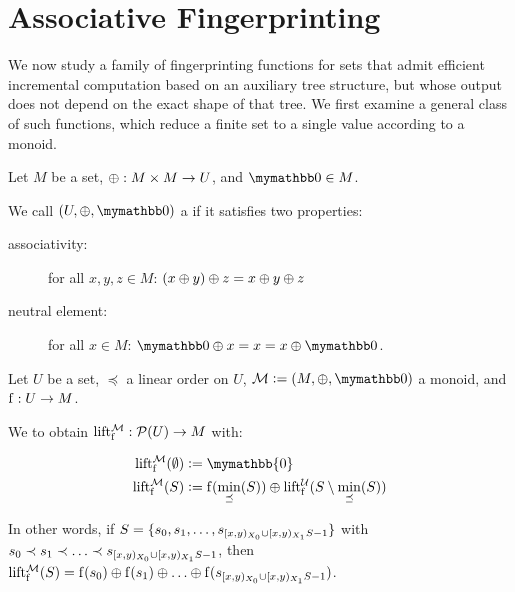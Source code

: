 
\section{Associative Fingerprinting}
\label{group-fingerprints}

We now study a family of fingerprinting functions for sets that admit efficient incremental computation based on an auxiliary tree structure, but whose output does not depend on the exact shape of that tree. We first examine a general class of such functions, which reduce a finite set to a single value according to a monoid.

\begin{definition}
Let $M$ be a set, $\oplus: M \times M \rightarrow U$, and $\neutraladd \in M$.

We call $(U, \groupaddsym, \neutraladd)$ a  if it satisfies two properties:

  \begin{description}
    \item[associativity:] for all $x, y, z \in M$: ${({x} \oplus {y})} \oplus {z} = {x} \oplus {{y} \oplus{z}}$
    \item[neutral element:] for all $x \in M$: $\groupadd{\neutraladd}{x} = x = \groupadd{x}{\neutraladd}$.
  \end{description}
\end{definition}

\begin{definition}
Let $U$ be a set, $\preceq$ a linear order on $U$, $\mathcal{M} \defeq (M, \groupaddsym, \neutraladd)$ a monoid, and ${\operatorname{f}}: {U} \rightarrow {M}$.

We  to obtain ${\operatorname{lift_{\operatorname{f}}^{\mathcal{M}}}}: {\mathcal{P}({U})} \rightarrow {M}$ with:

\begin{align*}
\lift{\f}{\mathcal{M}}(\emptyset) &\defeq \mymathbb{0}\\
\lift{\f}{\mathcal{M}}(S) &\defeq \f(\min_{\preceq}(S)) \oplus \lift{\f}{\mathcal{U}}(S \setminus \min_{\preceq}(S))\\
\end{align*}

In other words, if $S = \{s_0, s_1, \ldots, s_{[{x},{y})_{X_0} \cup [{x},{y})_{X_1}{S} - 1}\}$ with $s_0 \prec s_1 \prec \ldots \prec s_{[{x},{y})_{X_0} \cup [{x},{y})_{X_1}{S} - 1}$, then $\operatorname{lift_{\operatorname{f}}^{\mathcal{M}}}(S) = {\operatorname{f}(s_0)} \oplus {{\operatorname{f}(s_1)} \oplus{{\ldots} \oplus{\operatorname{f}(s_{[{x},{y})_{X_0} \cup [{x},{y})_{X_1}{S} - 1})}}}$.
\end{definition}

